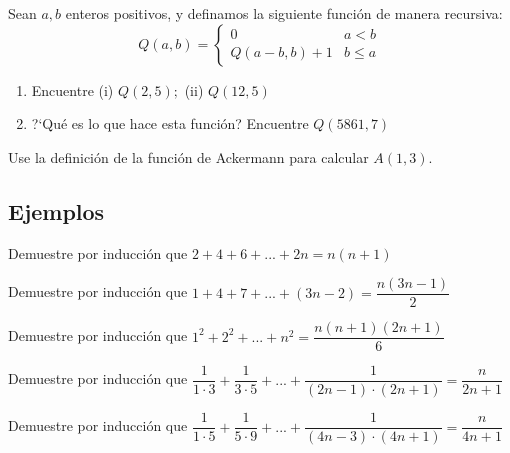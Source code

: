 	\begin{exmp}
		Sean $a,b$ enteros positivos, y definamos la siguiente funci\'on de manera recursiva:
		$$
		Q(a,b)=
		\begin{cases}
			0 & a<b \\
			Q(a-b,b)+1 & b \leq a
		\end{cases}
		$$
		\begin{enumerate}
			\item Encuentre (i) $Q(2,5);$ (ii) $Q(12,5)$
			\item ?`Qu\'e es lo que hace esta funci\'on? Encuentre $Q(5861,7)$
		\end{enumerate}
	\end{exmp}



	\begin{exmp}
		Use la definici\'on de la funci\'on de Ackermann para calcular $A(1,3).$
	\end{exmp}


\subsection{Ejemplos}


	\begin{exmp}
		Demuestre por inducción que 
		$\displaystyle 2+4+6+...+2n=n(n+1)$
	\end{exmp}



	\begin{exmp}
		Demuestre por inducción que 
		$\displaystyle 1+4+7+...+\left( 3n-2 \right)=\dfrac{n\left( 3n-1 \right)}{2}$
	\end{exmp}



	\begin{exmp}
		Demuestre por inducción que 
		$\displaystyle 1^{2}+2^{2}+...+n^{2}=\dfrac{n(n+1)(2n+1)}{6}$
	\end{exmp}



	\begin{exmp}
		Demuestre por inducción que 
		$\displaystyle \dfrac{1}{1\cdot 3}+\dfrac{1}{3\cdot 5}+...+\dfrac{1}{\left( 2n-1 \right)\cdot \left( 2n+1 \right)}=\dfrac{n}{2n+1}$
	\end{exmp}



	\begin{exmp}
		Demuestre por inducción que 		
		$\displaystyle \dfrac{1}{1\cdot 5}+ \dfrac{1}{5 \cdot 9}+...+\dfrac{1}{(4n-3)\cdot (4n+1)}=\dfrac{n}{4n+1}$
	\end{exmp}



